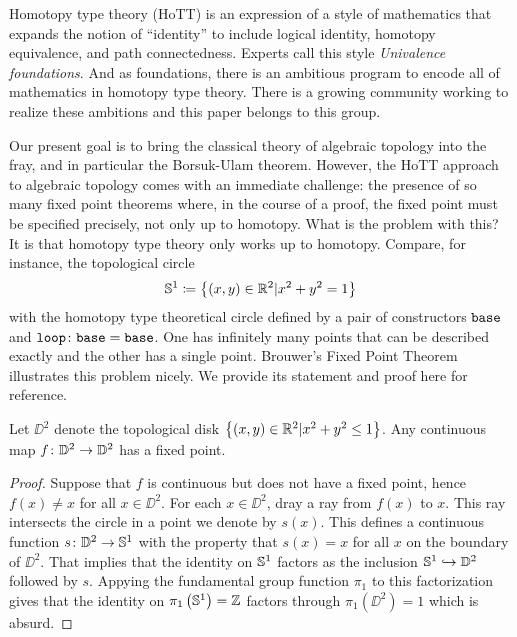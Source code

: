 \documentclass{amsart}
\begin{document}
Homotopy type theory (HoTT) is an expression of a style of
mathematics that expands the notion of ``identity'' to
include logical identity, homotopy equivalence, and path
connectedness.  Experts call this style \emph{Univalence
  foundations}. And as foundations, there is an ambitious
program to encode all of mathematics in homotopy type
theory. There is a growing community working to realize
these ambitions and this paper belongs to this group.

Our present goal is to bring the classical theory of
algebraic topology into the fray, and in particular the
Borsuk-Ulam theorem.  However, the HoTT approach to
algebraic topology comes with an immediate challenge: the
presence of so many fixed point theorems where, in the
course of a proof, the fixed point must be specified
precisely, not only up to homotopy.  What is the problem
with this?  It is that homotopy type theory only works up to
homotopy. Compare, for instance, the topological circle
$$ \mathbb{S}^1 \coloneqq \left\{ (x,y) \in \mathbb{R}^2 | x^2 + y^2 = 1
\right\} $$ with the homotopy type theoretical circle
defined by a pair of constructors $ \mathtt{base} $ and
$ \mathtt{loop} \colon \mathtt{base} = \mathtt{base}$. One has
infinitely many points that can be described exactly and the
other has a single point. Brouwer's Fixed Point Theorem
illustrates this problem nicely. We provide its statement
and proof here for reference.

\begin{theorem}
  Let $ \DD^2 $ denote the topological disk $ \left\{ (x,y)
      \in \mathbb{R}^2 | x^2 + y^2 \leq 1 \right\} $.  Any
  continuous map $ f \colon \mathbb{D}^2 \to \mathbb{D}^2 $ has a fixed point.
\end{theorem}

\begin{proof}
  Suppose that $ f $ is continuous but does not have a fixed
  point, hence $ f(x) \neq x $ for all $ x \in \DD^2 $.
  For each $ x \in \DD^2 $, dray a ray from $ f(x) $ to $ x
  $. This ray intersects the circle in a point we denote by
  $ s(x) $. This defines a continuous function $ s \colon
  \mathbb{D}^2 \to \mathbb{S}^1 $ with the property that $ s(x)=x $ for all $ x $ on
  the boundary of $ \DD^2 $.  That implies that the identity
  on $ \mathbb{S}^1 $ factors as the inclusion $ \mathbb{S}^1
  \hookrightarrow \mathbb{D}^2 $ followed by $ s $.  Appying the
  fundamental group function $ \pi_1 $ to this factorization
  gives that the identity on $ \pi_1 \left( \mathbb{S}^1 \right) =
  \mathbb{Z} $ factors through $ \pi_1 \left( \DD^2 \right) = 1 $
  which is absurd.
\end{proof}
\end{document}
